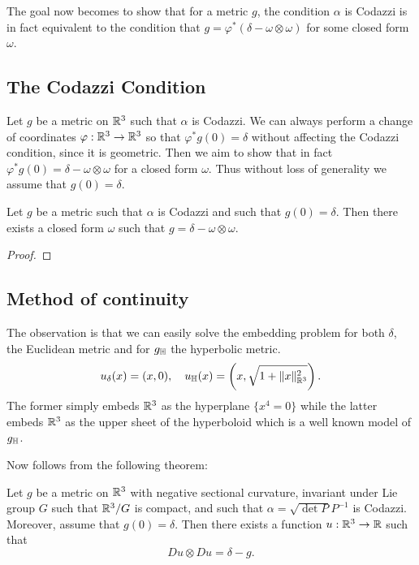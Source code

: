 \documentclass[a4paper, 12pt]{amsart}
\begin{document}
The goal now becomes to show that for a metric \(g\), the condition \(\alpha\) is Codazzi is in fact equivalent to the condition that \(g = \varphi^{\ast}(\delta - \omega \otimes \omega)\) for some closed form \(\omega\).

\subsection{The Codazzi Condition}
\label{subsec:codazzi}

Let \(g\) be a metric on \(\mathbb{R}^3\) such that \(\alpha\) is Codazzi. We can always perform a change of coordinates \(\varphi : \mathbb{R}^3 \to \mathbb{R}^3\) so that \(\varphi^{\ast} g (0) = \delta\) without affecting the Codazzi condition, since it is geometric. Then we  aim to show that in fact \(\varphi^{\ast} g(0) = \delta - \omega \otimes \omega\) for a closed form \(\omega\). Thus without loss of generality we assume that \(g(0) = \delta\).

\begin{thm}
Let \(g\) be a metric such that \(\alpha\) is Codazzi and such that \(g(0) = \delta\). Then there exists a closed form \(\omega\) such that \(g = \delta - \omega \otimes \omega\).
\end{thm}

\begin{proof}

\end{proof}


\subsection{Method of continuity}
\label{subsec:embedding_continuity}

The observation is that we can easily solve the embedding problem for both \(\delta\), the Euclidean metric and for \(g_{\mathbb{H}}\) the hyperbolic metric.
\[
u_{\delta} (x) = (x, 0), \quad u_{\mathbb{H}} (x) = \left(x, \sqrt{1 + \|x\|_{\mathbb{R}^3}^2}\right).
\]
The former simply embeds \(\mathbb{R}^3\) as the hyperplane \(\{x^4 = 0\}\) while the latter embeds \(\mathbb{R}^3\) as the upper sheet of the hyperboloid which is a well known model of \(g_{\mathbb{H}}\).

Now  follows from the following theorem:

\begin{thm}
\label{thm:pde}
Let \(g\) be a metric on \(\mathbb{R}^3\) with negative sectional curvature, invariant under Lie group \(G\) such that \(\mathbb{R}^3/G\) is compact, and such that \(\alpha = \sqrt{\det P}P^{-1}\) is Codazzi. Moreover, assume that \(g(0) = \delta\). Then there exists a function \(u : \mathbb{R}^3 \to \mathbb{R}\) such that
\[
Du \otimes Du = \delta - g.
\]
\end{thm}
\end{document}
